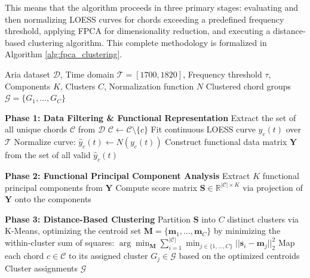 \documentclass[10pt,a4paper,twocolumn]{article}
\begin{document}
This means that the algorithm proceeds in three primary stages: evaluating and then normalizing LOESS curves for chords exceeding a predefined frequency threshold, applying FPCA for dimensionality reduction, and executing a distance-based clustering algorithm. This complete methodology is formalized in Algorithm \ref{alg:fpca_clustering}.

\begin{algorithm}
\caption{FPCA and Clustering of Chord Trajectories}
\label{alg:fpca_clustering}
\begin{algorithmic}[1]
\Require Aria dataset $\mathcal{D}$, Time domain $\mathcal{T} = [1700, 1820]$, Frequency threshold $\tau$, Components $K$, Clusters $C$, Normalization function $N$
\Ensure Clustered chord groups $\mathcal{G} = \{G_1, \dots, G_C\}$

\vspace{1.5mm}
\State \textbf{Phase 1: Data Filtering \& Functional Representation}
\State Extract the set of all unique chords $\mathcal{C}$ from $\mathcal{D}$
        \State $\mathcal{C} \gets \mathcal{C} \setminus \{c\}$
    \Else
        \State Fit continuous LOESS curve $y_c(t)$ over $\mathcal{T}$
        \State Normalize curve: $\hat{y}_c(t) \gets N(y_c(t))$
    \EndIf
\EndFor
\State Construct functional data matrix $\mathbf{Y}$ from the set of all valid $\hat{y}_c(t)$

\vspace{1.5mm}
\State \textbf{Phase 2: Functional Principal Component Analysis}
\State Extract $K$ functional principal components from $\mathbf{Y}$
\State Compute score matrix $\mathbf{S} \in \mathbb{R}^{|\mathcal{C}| \times K}$ via projection of $\mathbf{Y}$ onto the components

\vspace{1.5mm}
\State \textbf{Phase 3: Distance-Based Clustering}
\State Partition $\mathbf{S}$ into $C$ distinct clusters via K-Means, optimizing the centroid set $\mathbf{M} = \{\mathbf{m}_1, \dots, \mathbf{m}_C\}$ by minimizing the within-cluster sum of squares:
\Statex \hspace{1cm} $\arg\min_{\mathbf{M}} \sum_{i=1}^{|\mathcal{C}|} \min_{j \in \{1,\dots,C\}} ||\mathbf{s}_i - \mathbf{m}_j||_2^2$
\State Map each chord $c \in \mathcal{C}$ to its assigned cluster $G_j \in \mathcal{G}$ based on the optimized centroids
\State \Return Cluster assignments $\mathcal{G}$
\end{algorithmic}
\end{algorithm}
\end{document}
